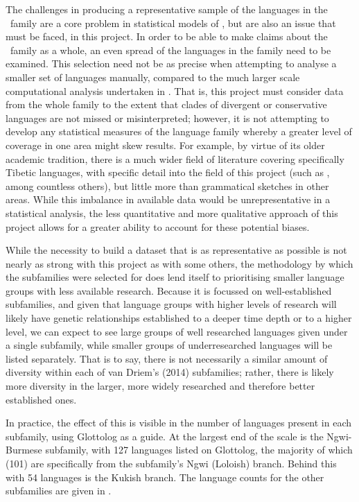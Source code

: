 The challenges in producing a representative sample of the languages in the \lfam\ family are a core problem in statistical models of , but are also an issue that must be faced, in this project. In order to be able to make claims about the \lfam\ family as a whole, an even spread of the languages in the family need to be examined. This selection need not be as precise when attempting to analyse a smaller set of languages manually, compared to the much larger scale computational analysis undertaken in . That is, this project must consider data from the whole family to the extent that clades of divergent or conservative languages are not missed or misinterpreted; however, it is not attempting to develop any statistical measures of the language family whereby a greater level of coverage in one area might skew results. For example, by virtue of its older academic tradition, there is a much wider field of literature covering specifically Tibetic languages, with specific detail into the field of this project (such as , among countless others), but little more than grammatical sketches in other areas. While this imbalance in available data would be unrepresentative in a statistical analysis, the less quantitative and more qualitative approach of this project allows for a greater ability to account for these potential biases.

While the necessity to build a dataset that is as representative as possible is not nearly as strong with this project as with some others, the methodology by which the subfamilies were selected for  does lend itself to prioritising smaller language groups with less available research. Because it is focussed on well-established subfamilies, and given that language groups with higher levels of research will likely have genetic relationships established to a deeper time depth or to a higher level, we can expect to see large groups of well researched languages given under a single subfamily, while smaller groups of underresearched languages will be listed separately. That is to say, there is not necessarily a similar amount of diversity within each of van Driem's (2014) subfamilies; rather, there is likely more diversity in the larger, more widely researched and therefore better established ones.

In practice, the effect of this is visible in the number of languages present in each subfamily, using Glottolog \cite{glottolog} as a guide. At the largest end of the scale is the Ngwi-Burmese subfamily, with 127 languages listed on Glottolog, the majority of which (101) are specifically from the subfamily's Ngwi (Loloish) branch. Behind this with 54 languages is the Kukish branch. The language counts for the other subfamilies are given in .

